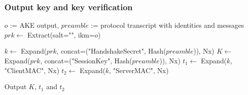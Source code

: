 \documentclass[../report.tex]{subfiles}
\begin{document}
% 
% 


\subsubsection{Output key and key verification}


\begin{algorithmic}
\Require $o$ := AKE output, $preamble$ := protocol transcript with identities and messages
\State $prk \gets$ Extract(salt="", ikm=$o$)


\State $k \gets$ Expand($prk$, concat=("HandshakeSecret", Hash($preamble$)), Nx)
\State $K \gets$ Expand($prk$, concat=("SessionKey", Hash($preamble$)), Nx)
\State $t_1 \gets$ Expand($k$, "ClientMAC", Nx)
\State $t_2 \gets$ Expand($k$, "ServerMAC", Nx)

\State Output $K$, $t_1$ and $t_2$
\end{algorithmic}

% 
% 
% 
\end{document}
